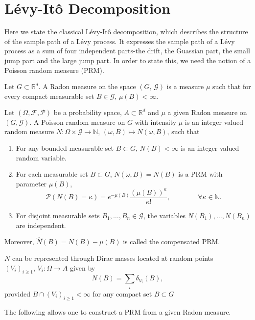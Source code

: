 \section{L\'evy-It\^o Decomposition}
Here we state the classical L\'evy-It\^o decomposition, which describes the structure of the sample path of a L\'evy process. It expresses the sample path of a L\'evy process as a sum of four independent parts-the drift, the Guassian part, the small jump part and the large jump part. In order to state this, we need the notion of a Poisson random measure (PRM). 
\begin{definition}
Let $G \subset \mathbb{R}^d$. A Radon measure on the space $(G, \, \mathcal{G})$ is a measure $\mu$ such that for every compact measurable set $B \in \mathcal{G}$, $\mu(B) < \infty$.
\end{definition}
\begin{definition}
Let $(\Omega , \mathcal{F}, \mathcal{P})$ be a probability space, $A \subset \mathbb{R}^d$ and $\mu$ a given Radon measure on $(G, \mathcal{G})$. A Poisson random measure on $G$ with intensity $\mu$ is an integer valued random measure 
$N: \Omega \times \mathcal{G} \to \mathbb{N}$, $(\omega, B) \mapsto N(\omega, B)$, such that
\begin{enumerate}[label=(\roman*)]
    \item For any bounded measurable set $B \subset G$, $N(B) < \infty$ is an integer valued random variable.
    \item For each measurable set $B \subset G$, $N(\omega, B) = N(B)$ is a PRM with parameter $\mu(B)$,
    \begin{equation}
        \mathcal{P}(N(B) = \kappa) = e^{-\mu(B)}\dfrac{(\mu(B))^\kappa}{\kappa!}, \qquad \qquad \forall \kappa \in \mathbb{N}.
    \end{equation}
    \item For disjoint measurable sets $B_1, \ldots , B_n \in \mathcal{G}$, the variables $N(B_1), \ldots , N(B_n)$ are independent.
\end{enumerate}
Moreover, $\hat{N}(B) = N(B) - \mu(B)$ is called the compensated PRM.
\end{definition}
\begin{remark}
$N$ can be represented through Dirac masses located at random points  \break $(V_i)_{i\geq1}, \, V_i: \Omega \to A$ given by $$N(B) = \sum_i \delta_{V_i}(B),$$ provided $B \cap (V_i)_{i\geq1} < \infty$ for any compact set $B \subset G$
\end{remark}
The following allows one to construct a PRM from a given Radon measure.
